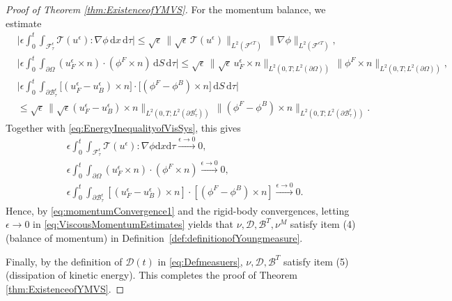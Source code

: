 \documentclass[11pt,twoside,reqno]{amsart}
\numberwithin{equation}{section}
\numberwithin{figure}{section}
\begin{document}
\begin{proof}[Proof of Theorem \ref{thm:ExistenceofYMVS}]
For the momentum balance, we estimate
\[
\begin{aligned}
&\Big|\epsilon\!\int_0^t\!\!\int_{\mathcal{F}^\epsilon_\tau }\mathcal{T}(u^\epsilon): \nabla \phi \,\mathrm{d}x\,\mathrm{d}\tau \Big|
\le \sqrt{\epsilon}\,\|\sqrt{\epsilon}\,\mathcal{T}(u^\epsilon)\|_{L^2(\mathcal{F}^{\epsilon T})}\,\|\nabla\phi\|_{L^2(\mathcal{F}^{\epsilon T})},\\&
\Big|\epsilon \!\int_0^t \!\!\int_{\partial \Omega} (u^\epsilon_F \times n) \cdot (\phi^F \times n)\,\mathrm{d}S\,\mathrm{d}\tau\Big|
\le\sqrt{\epsilon}\,\|\sqrt{\epsilon}\,u^\epsilon_F\times  n\|_{L^2(0,T;L^2(\partial\Omega))}\,\|\phi^F\times n\|_{L^2(0,T;L^2(\partial\Omega))},\\&
\Big|\epsilon \!\int_0^t \!\!\int_{\partial \mathcal{B}^\epsilon_\tau } \big[(u^\epsilon_F - u^\epsilon_B) \times n\big] \cdot \big[(\phi^F - \phi^B) \times n\big] \,\mathrm{d}S\,\mathrm{d}\tau\Big|\\&
\le\sqrt{\epsilon}\,\|\sqrt{\epsilon}(u^\epsilon_F-u^\epsilon_B)\times n\|_{L^2(0,T;L^2(\partial\mathcal{B}^\epsilon_\tau ))}\,\|(\phi^F-\phi^B)\times n\|_{L^2(0,T;L^2(\partial\mathcal{B}^\epsilon_\tau ))}.
\end{aligned}
\]
Together with \eqref{eq:EnergyInequalityofVisSys}, this gives 
\begin{equation}\label{eq:Demandforfinalresults}
    \begin{aligned}
        &\epsilon\int_0^t \int_{\mathcal{F}^\epsilon_\tau }\mathcal{T}(u^\epsilon): \nabla \phi \mathrm{d}x\mathrm{d}\tau \xrightarrow{\epsilon\to0} 0,\\
    &\epsilon \int_0^t  \int_{\partial \Omega} (u^\epsilon_F \times n) \cdot (\phi^F \times n)\xrightarrow{\epsilon\to0} 0,\\& \epsilon \int_0^t  \int_{\partial \mathcal{B}^\epsilon_\tau } [(u^\epsilon_F - u^\epsilon_B) \times n] \cdot [(\phi^F - \phi^B) \times n] \xrightarrow{\epsilon\to0} 0.
    \end{aligned}
\end{equation}
 Hence, by \eqref{eq:momentumConvergence1} and the rigid-body convergences, letting $\epsilon\to0$ in \eqref{eq:ViscousMomentumEstimates} yields that $\nu,\mathcal{D},\mathcal{B}^T,\nu^M$ satisfy item (4) (balance of momentum) in Definition~\ref{def:definitionofYoungmeasure}. 

Finally, by the definition of $\mathcal{D}(t)$ in \eqref{eq:Defmeasuers}, $\nu,\mathcal{D},\mathcal{B}^T$ satisfy item (5) (dissipation of kinetic energy). This completes the proof of Theorem \ref{thm:ExistenceofYMVS}. 
\end{proof}
\end{document}
